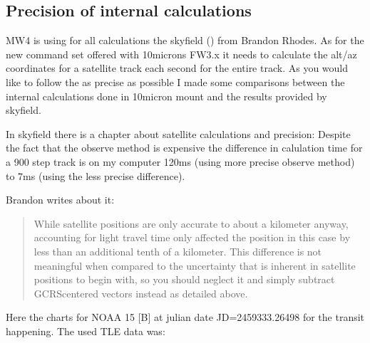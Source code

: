 \documentclass[a4paper,10pt,english]{sphinxmanual}
\begin{document}
\sphinxstepscope


\subsection{Precision of internal calculations}
\label{\detokenize{architecture/calculations:precision-of-internal-calculations}}\label{\detokenize{architecture/calculations::doc}}
\sphinxAtStartPar
MW4 is using for all calculations the skyfield ()
from Brandon Rhodes. As for the new command set offered with 10microns FW3.x it
needs to calculate the alt/az coordinates for a satellite track each second for
the entire track. As you would like to follow the as precise as possible I made
some comparisons between the internal calculations done in 10micron mount and the
results provided by skyfield.

\sphinxAtStartPar
In skyfield there is a chapter about satellite calculations and precision:
Despite the fact that the observe method is expensive the difference in calulation
time for a 900 step track is on my computer 120ms (using more precise observe
method) to 7ms (using the less precise difference).

\sphinxAtStartPar
Brandon writes about it:
\begin{quote}

\sphinxAtStartPar
While satellite positions are only accurate to about a kilometer anyway,
accounting for light travel time only affected the position in this case by
less than an additional tenth of a kilometer. This difference is not
meaningful when compared to the uncertainty that is inherent in satellite
positions to begin with, so you should neglect it and simply subtract
GCRS\sphinxhyphen{}centered vectors instead as detailed above.
\end{quote}

\sphinxAtStartPar
Here the charts for NOAA 15 {[}B{]} at julian date JD=2459333.26498 for the transit
happening. The used TLE data was:

\begin{sphinxVerbatim}[commandchars=\\\{\}]
  \PYG{p}{[}\PYG{p}{]}
              
        
\end{sphinxVerbatim}
\end{document}
